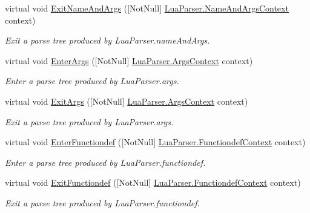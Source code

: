 \begin{DoxyCompactItemize}
virtual void \mbox{\hyperlink{classzlua_1_1_lua_base_listener_ae26d62193f8285daad3361d083e45c58}{Exit\+Name\+And\+Args}} (\mbox{[}Not\+Null\mbox{]} \mbox{\hyperlink{classzlua_1_1_lua_parser_1_1_name_and_args_context}{Lua\+Parser.\+Name\+And\+Args\+Context}} context)
\begin{DoxyCompactList}\small\item\em Exit a parse tree produced by Lua\+Parser.\+name\+And\+Args. \end{DoxyCompactList}\item 
virtual void \mbox{\hyperlink{classzlua_1_1_lua_base_listener_a86f29737c93fb7e2b6026209916ca3ff}{Enter\+Args}} (\mbox{[}Not\+Null\mbox{]} \mbox{\hyperlink{classzlua_1_1_lua_parser_1_1_args_context}{Lua\+Parser.\+Args\+Context}} context)
\begin{DoxyCompactList}\small\item\em Enter a parse tree produced by Lua\+Parser.\+args. \end{DoxyCompactList}\item 
virtual void \mbox{\hyperlink{classzlua_1_1_lua_base_listener_aee2d21cae37901e87685fc50c87f8f1f}{Exit\+Args}} (\mbox{[}Not\+Null\mbox{]} \mbox{\hyperlink{classzlua_1_1_lua_parser_1_1_args_context}{Lua\+Parser.\+Args\+Context}} context)
\begin{DoxyCompactList}\small\item\em Exit a parse tree produced by Lua\+Parser.\+args. \end{DoxyCompactList}\item 
virtual void \mbox{\hyperlink{classzlua_1_1_lua_base_listener_a3882098639066deade08be5eb8d94f70}{Enter\+Functiondef}} (\mbox{[}Not\+Null\mbox{]} \mbox{\hyperlink{classzlua_1_1_lua_parser_1_1_functiondef_context}{Lua\+Parser.\+Functiondef\+Context}} context)
\begin{DoxyCompactList}\small\item\em Enter a parse tree produced by Lua\+Parser.\+functiondef. \end{DoxyCompactList}\item 
virtual void \mbox{\hyperlink{classzlua_1_1_lua_base_listener_adb6913ed219a112505cb4ba783485c2e}{Exit\+Functiondef}} (\mbox{[}Not\+Null\mbox{]} \mbox{\hyperlink{classzlua_1_1_lua_parser_1_1_functiondef_context}{Lua\+Parser.\+Functiondef\+Context}} context)
\begin{DoxyCompactList}\small\item\em Exit a parse tree produced by Lua\+Parser.\+functiondef. \end{DoxyCompactList}\item 

\end{DoxyCompactItemize}

